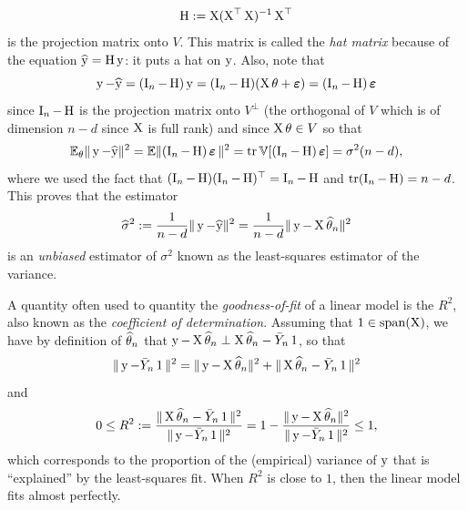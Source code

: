 \begin{equation*}
	\bH := \bX (\bX^\top \bX)^{-1} \bX^\top	
\end{equation*}
is the projection matrix onto $V$.
This matrix is called the \emph{hat matrix} because of the equation $\wh \by = \bH \by$: it puts a hat on $\by$.
Also, note that
\begin{equation}
	\label{eq:residual-noise-relation}
	\by - \wh \by = (\bI_n - \bH) \by = (\bI_n - \bH) (\bX \theta + \beps) = (\bI_n - \bH) \beps
\end{equation} 
since $\bI_n - \bH$ is the projection matrix onto $V^\perp$ (the orthogonal of $V$ which is of dimension $n-d$ since $\bX$ is full rank) and since $\bX \theta \in V$ so that
\begin{equation*}
	\E_\theta \norm{\by - \wh \by}^2 = \E \norm{(\bI_n - \bH) \beps}^2 = \tr \var[(\bI_n - \bH) \beps] = \sigma^2 (n - d),
\end{equation*}
where we used the fact that $(\bI_n - \bH) (\bI_n - \bH)^\top = \bI_n - \bH$ and $\tr(\bI_n - \bH) = n - d$.
This proves that the estimator
\begin{equation*}
	\wh \sigma^2 := \frac{1}{n - d} \norm{\by - \wh \by}^2 
	= \frac{1}{n - d} \norm{\by - \bX \wh \theta_n}^2
\end{equation*}
is an \emph{unbiased} estimator of $\sigma^2$ known as the least-squares estimator of the variance.

A quantity often used to quantity the \emph{goodness-of-fit} of a linear model is the $R^2$, also known as the \emph{coefficient of determination}.
Assuming that $\bone \in \spa(\bX)$, we have by definition of $\wh \theta_n$ that $\by - \bX \wh \theta_n \perp \bX \wh \theta_n - \bar Y_n \bone$,%
so that
\begin{equation*}
	\norm{\by - \bar Y_n \bone}^2 = \norm{\by - \bX \wh \theta_n}^2 
	+ \norm{\bX \wh \theta_n - \bar Y_n \bone}^2
\end{equation*}
and
\begin{equation*}
	0 \leq R^2 := \frac{\norm{\bX \wh \theta_n - \bar Y_n \bone}^2}{\norm{\by - \bar Y_n \bone}^2} = 1 - \frac{\norm{\by - \bX \wh \theta_n}^2 }{\norm{\by - \bar Y_n \bone}^2} \leq 1,
\end{equation*}
which corresponds to the proportion of the (empirical) variance of $\by$ that is ``explained'' by the least-squares fit.
When $R^2$ is close to $1$, then the linear model fits almost perfectly.%

